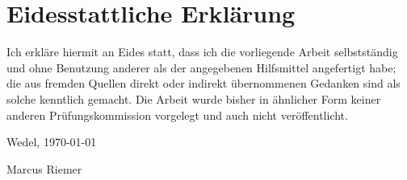 \section{Eidesstattliche Erklärung}
Ich erkl\"are hiermit an Eides statt, dass ich die vorliegende Arbeit selbstst\"andig und ohne Benutzung anderer als der angegebenen Hilfsmittel angefertigt habe; die aus fremden Quellen direkt oder indirekt \"ubernommenen Gedanken sind als solche kenntlich gemacht. Die Arbeit wurde bisher in \"ahnlicher Form keiner anderen Pr\"ufungskommission vorgelegt und auch nicht ver\"offentlicht.

\bigskip
\bigskip
\bigskip
\bigskip
	
\begin{multicols}{2}
  \raggedright
  Wedel, \today{}
  
  \raggedleft
  Marcus Riemer
\end{multicols}
